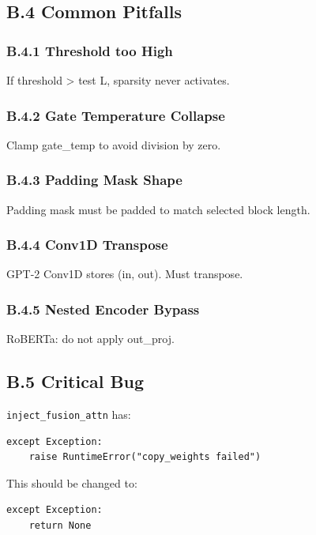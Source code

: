 \subsection{B.4 Common Pitfalls}

\subsubsection{B.4.1 Threshold too High}

If threshold > test L, sparsity never activates.

\subsubsection{B.4.2 Gate Temperature Collapse}

Clamp gate\_temp to avoid division by zero.

\subsubsection{B.4.3 Padding Mask Shape}

Padding mask must be padded to match selected block length.

\subsubsection{B.4.4 Conv1D Transpose}

GPT-2 Conv1D stores (in, out). Must transpose.

\subsubsection{B.4.5 Nested Encoder Bypass}

RoBERTa: do not apply out\_proj.

\subsection{B.5 Critical Bug}

\texttt{inject\_fusion\_attn} has:

\begin{lstlisting}
except Exception:
    raise RuntimeError("copy_weights failed")
\end{lstlisting}

This should be changed to:

\begin{lstlisting}
except Exception:
    return None
\end{lstlisting}

